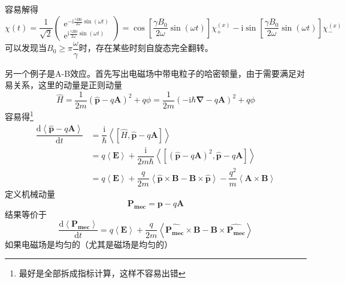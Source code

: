 \documentclass[12pt, a4paper, oneside]{ctexart}
\begin{document}
	\quad\quad 容易解得
	\begin{equation}
		\chi(t)=\dfrac{1}{\sqrt{2}}\begin{pmatrix}
			\mathrm{e}^{-\mathrm{i}\frac{\gamma B{0}}{2\omega}\sin(\omega t)}\\
			\mathrm{e}^{\mathrm{i}\frac{\gamma B{0}}{2\omega}\sin(\omega t)}
		\end{pmatrix}=\cos\left[\dfrac{\gamma B_{0}}{2\omega}\sin\left(\omega t\right)\right]\chi_{+}^{\left(x\right)}-\mathrm{i}\sin\left[\dfrac{\gamma B_{0}}{2\omega}\sin\left(\omega t\right)\right]\chi_{-}^{\left(x\right)}
	\end{equation}
	\quad\quad 可以发现当$B_{0}\ge\pi\dfrac{\omega}{\gamma}$时，存在某些时刻自旋态完全翻转。\par
	另一个例子是A-B效应。首先写出电磁场中带电粒子的哈密顿量，由于需要满足对易关系，这里的动量是正则动量
	\begin{equation}
		\hat{H}=\dfrac{1}{2m}\left(\boldsymbol{\hat{p}}-q\boldsymbol{A}\right)^{2}+q\phi=\dfrac{1}{2m}\left(-\mathrm{i}\hbar\boldsymbol{\nabla}-q\boldsymbol{A}\right)^{2}+q\phi
	\end{equation}
	\quad\quad 容易得\footnote{最好是全部拆成指标计算，这样不容易出错}
	\begin{align}
		\dfrac{\mathrm{d}\left<\boldsymbol{\hat{p}}-q\boldsymbol{A}\right>}{\mathrm{d}t}&=\dfrac{\mathrm{i}}{\hbar}\left<\left[\hat{H},\boldsymbol{\hat{p}}-q\boldsymbol{A}\right]\right>\\
		&=q\left<\boldsymbol{E}\right>+\dfrac{\mathrm{i}}{2m\hbar}\left<\left[\left(\boldsymbol{\hat{p}}-q\boldsymbol{A}\right)^{2},\boldsymbol{\hat{p}}-q\boldsymbol{A}\right]\right>\\
		&=q\left<\boldsymbol{E}\right>+\dfrac{q}{2m}\left<\boldsymbol{\hat{p}}\times\boldsymbol{B}-\boldsymbol{B}\times\boldsymbol{\hat{p}}\right>-\dfrac{q^{2}}{m}\left<\boldsymbol{A}\times\boldsymbol{B}\right>
	\end{align}
	\quad\quad 定义机械动量
	\begin{equation}
		\boldsymbol{P_{mec}}=\boldsymbol{p}-q\boldsymbol{A}
	\end{equation}
	\quad\quad 结果等价于
	\begin{equation}
		\dfrac{\mathrm{d}\left<\boldsymbol{P_{mec}}\right>}{\mathrm{d}t}=q\left<\boldsymbol{E}\right>+\dfrac{q}{2m}\left<\boldsymbol{\hat{P_{mec}}}\times\boldsymbol{B}-\boldsymbol{B}\times\boldsymbol{\hat{P_{mec}}}\right>
	\end{equation}
	\quad\quad 如果电磁场是均匀的（尤其是磁场是均匀的）
\end{document}
